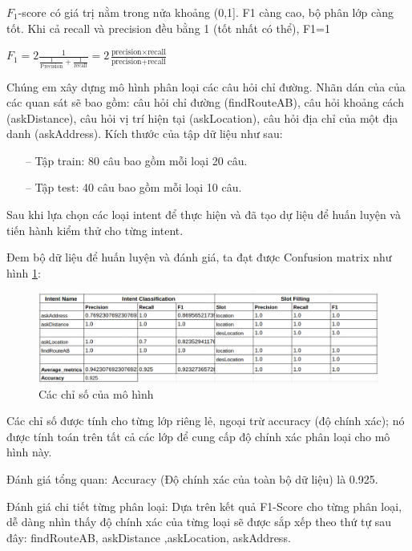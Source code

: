 $F_{1}$-score có giá trị nằm trong nửa khoảng (0,1]. F1 càng cao, bộ phân lớp càng tốt. Khi cả recall và precision đều bằng 1 (tốt nhất có thể), F1=1
\begin{center}
    $F_{1}=2\frac{1}{\frac{1}{\text{Precision}} + \frac{1}{\text{recall}}}= 2\frac{\text{precision} \times \text{recall}}{\text{precision} + \text{recall}}$
\end{center}

Chúng em xây dựng mô hình phân loại các câu hỏi chỉ đường. Nhãn dán của của các quan sát sẽ bao gồm: câu hỏi chỉ đường (findRouteAB), câu hỏi khoảng cách (askDistance), câu hỏi vị trí hiện tại (askLocation), câu hỏi địa chỉ của một địa danh (askAddress). Kích thước của tập dữ liệu như sau:
\begin{itemize}
    \item[--] Tập train: 80 câu bao gồm mỗi loại 20 câu.
    \item[--] Tập test: 40 câu bao gồm mỗi loại 10 câu.
\end{itemize}

Sau khi lựa chọn các loại intent để thực hiện và đã tạo dự liệu để huấn luyện và tiến hành kiểm thử cho từng intent.

Đem bộ dữ liệu để huấn luyện và đánh giá, ta đạt được Confusion matrix như hình \ref{fig:metrics-dict-end}:

\begin{figure}[htp]
    \centering
    \includegraphics[width=15cm]{images/metrics-dict.png}
    \caption{Các chỉ số của mô hình}
    \label{fig:metrics-dict-end}
\end{figure}

Các chỉ số được tính cho từng lớp riêng lẻ, ngoại trừ accuracy (độ chính xác); nó được tính toán trên tất cả các lớp để cung cấp độ chính xác phân loại cho mô hình này.

Đánh giá tổng quan: Accuracy (Độ chính xác của toàn bộ dữ liệu) là 0.925.

Đánh giá chi tiết từng phân loại: Dựa trên kết quả F1-Score cho từng phân loại, dễ dàng nhìn thấy độ chính xác của từng loại sẽ được sắp xếp theo thứ tự sau đây: findRouteAB, askDistance ,askLocation, askAddress.

